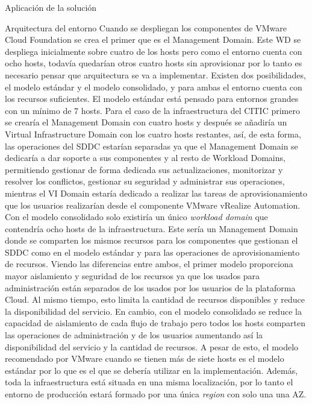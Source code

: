 \begin{chapter}{Aplicación de la solución}
\begin{section}{Arquitectura del entorno}
Cuando se despliegan los componentes de VMware Cloud Foundation se crea el primer  que es el Management Domain. Este WD se despliega inicialmente sobre cuatro de los hosts pero como el entorno cuenta con ocho hosts, todavía quedarían otros cuatro hosts sin aprovisionar por lo tanto es necesario pensar que arquitectura se va a implementar. Existen dos posibilidades, el modelo estándar y el modelo consolidado, y para ambas el entorno cuenta con los recursos suficientes.
El modelo estándar está pensado para entornos grandes con un mínimo de 7 hosts. Para el caso de la infraestructura del CITIC primero se crearía el Management Domain con cuatro hosts y después se añadiría un Virtual Infrastructure Domain con los cuatro hosts restantes, así, de esta forma, las operaciones del SDDC estarían separadas ya que el Management Domain se dedicaría a dar soporte a sus componentes y al resto de Workload Domains, permitiendo gestionar de forma dedicada sus actualizaciones, monitorizar y resolver los conflictos, gestionar su seguridad y administrar sus operaciones, mientras el VI Domain estaría dedicado a realizar las tareas de aprovisionamiento que los usuarios realizarían desde el componente VMware vRealize Automation.
Con el modelo consolidado solo existiría un único \textit{workload domain} que contendría ocho hosts de la infraestructura. Este sería un Management Domain donde se comparten los mismos recursos para los componentes que gestionan el SDDC como en el modelo estándar y para las operaciones de aprovisionamiento de recursos. 
Viendo las diferencias entre ambos, el primer modelo proporciona mayor aislamiento y seguridad de los recursos ya que los usados para administración están separados de los usados por los usuarios de la plataforma Cloud. Al mismo tiempo, esto limita la cantidad de recursos disponibles y reduce la disponibilidad del servicio. En cambio, con el modelo consolidado se reduce la capacidad de aislamiento de cada flujo de trabajo pero todos los hosts comparten las operaciones de administración y de los usuarios aumentando así la disponibilidad del servicio y la cantidad de recursos. A pesar de esto, el modelo recomendado por VMware cuando se tienen más de siete hosts es el modelo estándar por lo que es el que se debería utilizar en la implementación.
Además, toda la infraestructura está situada en una misma localización, por lo tanto el entorno de producción estará formado por una única \textit{region} con solo una una AZ.


\end{section}
\end{chapter}
